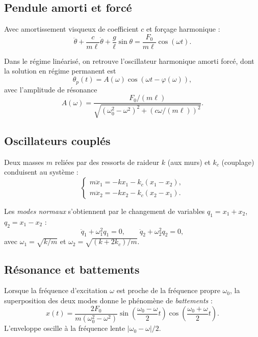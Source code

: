 \documentclass[12pt,a4paper,openany]{book}
\theoremstyle{definition}
\theoremstyle{plain}
\theoremstyle{remark}
\newcommand{\abs}[1]{\left|#1\right|}
\begin{document}
\subsection{Pendule amorti et forcé}
\label{subsec:pendule-amorti}

Avec amortissement visqueux de coefficient $c$ et forçage harmonique :
\begin{equation}
\label{eq:pendule-force}
\ddot{\theta} + \frac{c}{m\ell}\dot{\theta}
+ \frac{g}{\ell}\sin\theta = \frac{F_0}{m\ell}\cos(\omega t).
\end{equation}

Dans le régime linéarisé, on retrouve l'oscillateur harmonique amorti
forcé, dont la solution en régime permanent est
\[
\theta_p(t) = A(\omega)\cos(\omega t - \varphi(\omega)),
\]
avec l'amplitude de résonance
\[
A(\omega) = \frac{F_0/(m\ell)}
{\sqrt{(\omega_0^2 - \omega^2)^2 + (c\omega/(m\ell))^2}}.
\]

\subsection{Oscillateurs couplés}
\label{subsec:oscillateurs-couples}

Deux masses $m$ reliées par des ressorts de raideur $k$ (aux murs)
et $k_c$ (couplage) conduisent au système :
\begin{equation}
\label{eq:oscillateurs-couples}
\begin{cases}
m\ddot{x}_1 = -kx_1 - k_c(x_1 - x_2), \\
m\ddot{x}_2 = -kx_2 - k_c(x_2 - x_1).
\end{cases}
\end{equation}

Les \emph{modes normaux} s'obtiennent par le
changement de variables $q_1 = x_1 + x_2$, $q_2 = x_1 - x_2$ :
\[
\ddot{q}_1 + \omega_1^2 q_1 = 0, \qquad
\ddot{q}_2 + \omega_2^2 q_2 = 0,
\]
avec $\omega_1 = \sqrt{k/m}$ et
$\omega_2 = \sqrt{(k + 2k_c)/m}$.

\subsection{Résonance et battements}
\label{subsec:resonance-battements}

Lorsque la fréquence d'excitation $\omega$ est proche de la fréquence
propre $\omega_0$, la superposition des deux modes donne le phénomène
de \emph{battements} :
\[
x(t) = \frac{2F_0}{m(\omega_0^2 - \omega^2)}
\sin\!\left(\frac{\omega_0 - \omega}{2}t\right)
\cos\!\left(\frac{\omega_0 + \omega}{2}t\right).
\]
L'enveloppe oscille à la fréquence lente
$\abs{\omega_0 - \omega}/2$.
\end{document}
